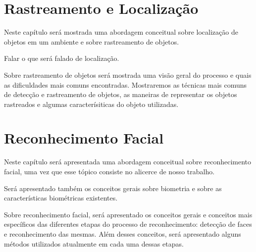 \chapter{Rastreamento e Localização}

	Neste capítulo será mostrada uma abordagem conceitual sobre localização de objetos em um ambiente e sobre rastreamento de objetos.

	Falar o que será falado de localização.

	Sobre rastreamento de objetos será mostrada uma visão geral do processo e quais as dificuldades mais comuns encontradas. Mostraremos as técnicas mais comuns de detecção e rastreamento de objetos, as maneiras de representar os objetos rastreados e algumas caracterísiticas do objeto utilizadas.

	
	
	

\chapter{Reconhecimento Facial}

	Neste capítulo será apresentada uma abordagem conceitual sobre reconhecimento facial, uma vez que esse tópico consiste no alicerce de nosso trabalho. 

	Será apresentado também os conceitos gerais sobre biometria e sobre as características biométricas existentes.

	Sobre reconhecimento facial, será apresentado os conceitos gerais e conceitos mais específicos das diferentes etapas do processo de reconhecimento: detecção de faces e reconhecimento das mesmas. Além desses conceitos, será apresentado alguns métodos utilizados atualmente em cada uma dessas etapas.


	
	






























